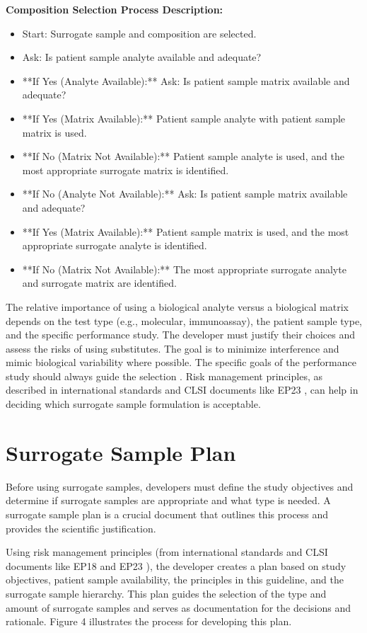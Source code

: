 \documentclass{article}
\begin{document}
\textbf{Composition Selection Process Description:}
\begin{itemize}
    \item Start: Surrogate sample and composition are selected.
    \item Ask: Is patient sample analyte available and adequate?
    \item **If Yes (Analyte Available):** Ask: Is patient sample matrix available and adequate?
    \item **If Yes (Matrix Available):** Patient sample analyte with patient sample matrix is used.
    \item **If No (Matrix Not Available):** Patient sample analyte is used, and the most appropriate surrogate matrix is identified.
    \item **If No (Analyte Not Available):** Ask: Is patient sample matrix available and adequate?
    \item **If Yes (Matrix Available):** Patient sample matrix is used, and the most appropriate surrogate analyte is identified.
    \item **If No (Matrix Not Available):** The most appropriate surrogate analyte and surrogate matrix are identified.
\end{itemize}

The relative importance of using a biological analyte versus a biological matrix depends on the test type (e.g., molecular, immunoassay), the patient sample type, and the specific performance study. The developer must justify their choices and assess the risks of using substitutes. The goal is to minimize interference and mimic biological variability where possible. The specific goals of the performance study should always guide the selection \cite{CLSIEP39Ed1E}. Risk management principles, as described in international standards and CLSI documents like EP23 \cite{CLSIEP23}, can help in deciding which surrogate sample formulation is acceptable.

\section{Surrogate Sample Plan}

Before using surrogate samples, developers must define the study objectives and determine if surrogate samples are appropriate and what type is needed. A surrogate sample plan is a crucial document that outlines this process and provides the scientific justification.

Using risk management principles (from international standards and CLSI documents like EP18 \cite{CLSIEP18} and EP23 \cite{CLSIEP23}), the developer creates a plan based on study objectives, patient sample availability, the principles in this guideline, and the surrogate sample hierarchy. This plan guides the selection of the type and amount of surrogate samples and serves as documentation for the decisions and rationale. Figure 4 illustrates the process for developing this plan.
\end{document}
